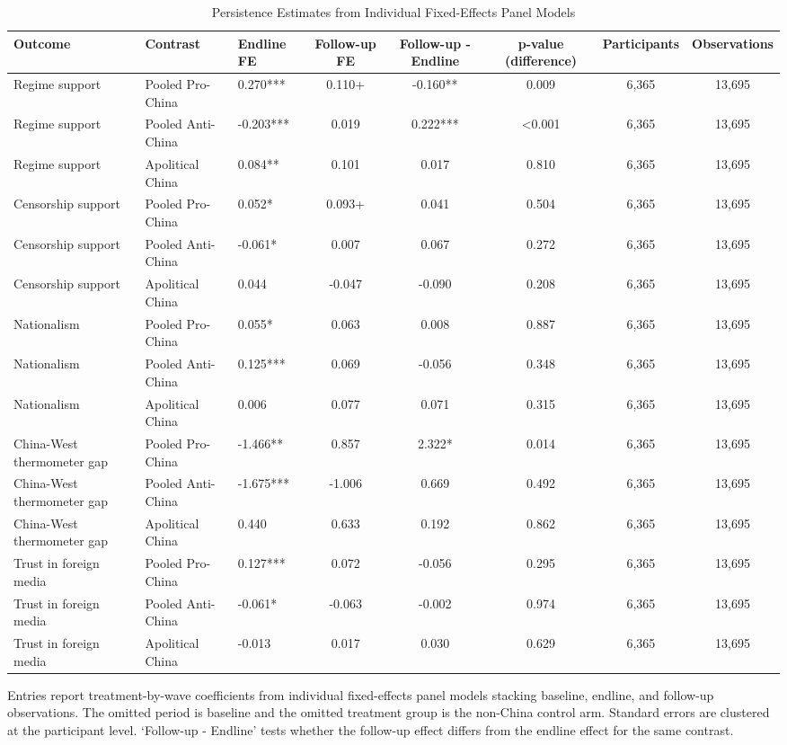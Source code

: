 \begin{table}[H]
\centering
\caption{Persistence Estimates from Individual Fixed-Effects Panel Models}
\label{tab:persistence_panel_fe}
\footnotesize
\begin{threeparttable}
\begin{tabular}{lllccccc}
\toprule
Outcome & Contrast & Endline FE & Follow-up FE & Follow-up - Endline & p-value (difference) & Participants & Observations \\
\midrule
Regime support & Pooled Pro-China & 0.270*** & 0.110+ & -0.160** & 0.009 & 6,365 & 13,695 \\
Regime support & Pooled Anti-China & -0.203*** & 0.019 & 0.222*** & <0.001 & 6,365 & 13,695 \\
Regime support & Apolitical China & 0.084** & 0.101 & 0.017 & 0.810 & 6,365 & 13,695 \\
Censorship support & Pooled Pro-China & 0.052* & 0.093+ & 0.041 & 0.504 & 6,365 & 13,695 \\
Censorship support & Pooled Anti-China & -0.061* & 0.007 & 0.067 & 0.272 & 6,365 & 13,695 \\
Censorship support & Apolitical China & 0.044 & -0.047 & -0.090 & 0.208 & 6,365 & 13,695 \\
Nationalism & Pooled Pro-China & 0.055* & 0.063 & 0.008 & 0.887 & 6,365 & 13,695 \\
Nationalism & Pooled Anti-China & 0.125*** & 0.069 & -0.056 & 0.348 & 6,365 & 13,695 \\
Nationalism & Apolitical China & 0.006 & 0.077 & 0.071 & 0.315 & 6,365 & 13,695 \\
China-West thermometer gap & Pooled Pro-China & -1.466** & 0.857 & 2.322* & 0.014 & 6,365 & 13,695 \\
China-West thermometer gap & Pooled Anti-China & -1.675*** & -1.006 & 0.669 & 0.492 & 6,365 & 13,695 \\
China-West thermometer gap & Apolitical China & 0.440 & 0.633 & 0.192 & 0.862 & 6,365 & 13,695 \\
Trust in foreign media & Pooled Pro-China & 0.127*** & 0.072 & -0.056 & 0.295 & 6,365 & 13,695 \\
Trust in foreign media & Pooled Anti-China & -0.061* & -0.063 & -0.002 & 0.974 & 6,365 & 13,695 \\
Trust in foreign media & Apolitical China & -0.013 & 0.017 & 0.030 & 0.629 & 6,365 & 13,695 \\
\bottomrule
\end{tabular}
\begin{tablenotes}[flushleft]
\footnotesize
\item Entries report treatment-by-wave coefficients from individual fixed-effects panel models stacking baseline, endline, and follow-up observations. The omitted period is baseline and the omitted treatment group is the non-China control arm. Standard errors are clustered at the participant level. `Follow-up - Endline' tests whether the follow-up effect differs from the endline effect for the same contrast.
\end{tablenotes}
\end{threeparttable}
\end{table}
